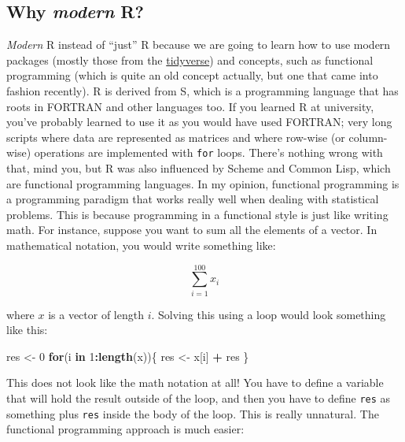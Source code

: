 \documentclass[]{gitbook}
\newenvironment{Shaded}{\begin{snugshade}}{\end{snugshade}}
\newcommand{\ControlFlowTok}[1]{\textcolor[rgb]{0.13,0.29,0.53}{\textbf{#1}}}
\newcommand{\DecValTok}[1]{\textcolor[rgb]{0.00,0.00,0.81}{#1}}
\newcommand{\KeywordTok}[1]{\textcolor[rgb]{0.13,0.29,0.53}{\textbf{#1}}}
\newcommand{\NormalTok}[1]{#1}
\newcommand{\OperatorTok}[1]{\textcolor[rgb]{0.81,0.36,0.00}{\textbf{#1}}}
\newcommand{\StringTok}[1]{\textcolor[rgb]{0.31,0.60,0.02}{#1}}
\theoremstyle{definition}
\theoremstyle{definition}
\theoremstyle{definition}
\theoremstyle{remark}
\begin{document}
\hypertarget{why-modern-r}{%
\subsection*{\texorpdfstring{Why \emph{modern}
R?}{Why modern R?}}\label{why-modern-r}}

\emph{Modern} R instead of ``just'' R because we are going to learn how
to use modern packages (mostly those from the
\href{https://www.tidyverse.org/}{tidyverse}) and concepts, such as
functional programming (which is quite an old concept actually, but one
that came into fashion recently). R is derived from S, which is a
programming language that has roots in FORTRAN and other languages too.
If you learned R at university, you've probably learned to use it as you
would have used FORTRAN; very long scripts where data are represented as
matrices and where row-wise (or column-wise) operations are implemented
with \texttt{for} loops. There's nothing wrong with that, mind you, but
R was also influenced by Scheme and Common Lisp, which are functional
programming languages. In my opinion, functional programming is a
programming paradigm that works really well when dealing with
statistical problems. This is because programming in a functional style
is just like writing math. For instance, suppose you want to sum all the
elements of a vector. In mathematical notation, you would write
something like:

\[
\sum_{i = 1}^{100} x_{i}
\]

where \(x\) is a vector of length \(i\). Solving this using a loop would
look something like this:

\begin{Shaded}
\begin{Highlighting}[]
\NormalTok{res <-}\StringTok{ }\DecValTok{0}
\ControlFlowTok{for}\NormalTok{(i }\ControlFlowTok{in} \DecValTok{1}\OperatorTok{:}\KeywordTok{length}\NormalTok{(x))\{}
\NormalTok{  res <-}\StringTok{ }\NormalTok{x[i] }\OperatorTok{+}\StringTok{ }\NormalTok{res}
\NormalTok{\}}
\end{Highlighting}
\end{Shaded}

This does not look like the math notation at all! You have to define a
variable that will hold the result outside of the loop, and then you
have to define \texttt{res} as something plus \texttt{res} inside the
body of the loop. This is really unnatural. The functional programming
approach is much easier:
\end{document}
